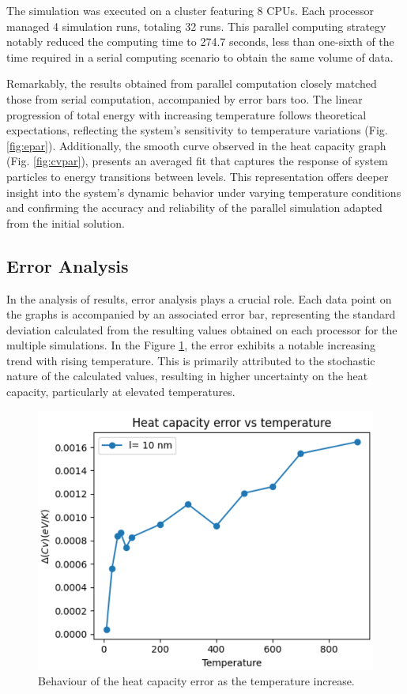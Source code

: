 \documentclass[%
 reprint,
 amsmath,amssymb,
 aps,
]{revtex4-2}
\begin{document}
The simulation was executed on a cluster featuring 8 CPUs. Each processor managed 4 simulation runs, totaling 32 runs. This parallel computing strategy notably reduced the computing time to 274.7 seconds, less than one-sixth of the time required in a serial computing scenario to obtain the same volume of data. 

Remarkably, the results obtained from parallel computation closely matched those from serial computation, accompanied by error bars too. The linear progression of total energy with increasing temperature follows theoretical expectations, reflecting the system's sensitivity to temperature variations (Fig. \ref{fig:epar}). Additionally, the smooth curve observed in the heat capacity graph (Fig. \ref{fig:cvpar}), presents an averaged fit that captures the response of system particles to energy transitions between levels. This representation offers deeper insight into the system's dynamic behavior under varying temperature conditions and confirming the accuracy and reliability of the parallel simulation adapted from the initial solution. 

\subsection{Error Analysis}
    In the analysis of results, error analysis plays a crucial role. Each data point on the graphs is accompanied by an associated error bar, representing the standard deviation calculated from the resulting values obtained on each processor for the multiple simulations. In the Figure \ref{fig:errorcv}, the error exhibits a notable increasing trend with rising temperature. This is primarily attributed to the stochastic nature of the calculated values, resulting in higher uncertainty on the heat capacity, particularly at elevated temperatures.
    \begin{figure}[!h]
        \centering
        \includegraphics[width=0.7\linewidth]{ERRORCVFV.png}
        \caption{Behaviour of the heat capacity error as the temperature increase.}
        \label{fig:errorcv}
    \end{figure}
    
\end{document}

